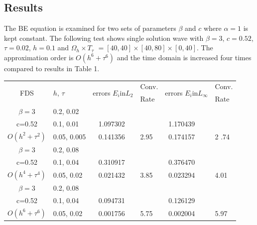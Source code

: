 \documentclass[a0,portrait]{a0poster}
\begin{document}
\begin{multicols}{2}
\section*{Results}
The BE equation  is examined for two sets of parameters $\beta$ and $c$ where $\alpha = 1$ is kept constant. The following test shows single solution wave with $\beta = 3$, $c = 0.52$, $\tau = 0.02$, $h = 0.1$ and $\Omega_h \times T_{\tau}$ $= [40, 40] \times [40, 80] \times [0, 40]$. The approximation order is $O(h^6 + \tau^6)$ and the time domain is increased four times compared to results in Table 1.

\begin{center}\vspace{0.4cm}
		\begin{tabular}{||c|l|ll|ll||}
			\hline
			\hline
      \multirow{2  }{*}{FDS}        & \multirow{2  }{*}{$h$, $\tau$}  & \multirow{2  }{*}{errors $E_i$in$L_2$}  &Conv.& \multirow{2  }{*}{errors $E_i$in$L_\infty$}  &Conv.  \\
	         &                    &                               & Rate   &                                        & Rate \\
   			\hline 
					\hline 
  $\beta=3$       &0.2, 0.02   &            &        &                  &      \\
      c=0.52   &0.1, 0.01   &~ 1.097302 &           &~1.170439      &       \\
     $O(h^2 + \tau^ 2)$ &0.05, 0.005 &~ 0.141356 &2.95  &~0.174157 & 2 .74       \\
			\hline 
   $\beta=3$        &0.2, 0.08   &            &        &                  &      \\
   c=0.52   &0.1, 0.04   &~ 0.310917 &           &~0.376470      &       \\
     $O(h^4+ \tau^4)$ &0.05, 0.02 &~ 0.021432 &3.85 &~0.023294 & 4.01        \\
			\hline 
  $\beta=3$               &0.2, 0.08   &            &        &                  &      \\
   c=0.52                  &0.1, 0.04       &~ 0.094731 &           &~0.126129      &       \\
     $O(h^6+ \tau^6)$ &0.05, 0.02 &~ 0.001756 &5.75    &~0.002004 & 5.97       \\
	   \hline
			\hline 
\end{tabular}
\end{center}\vspace{0.4cm}


\end{multicols}
\end{document}
